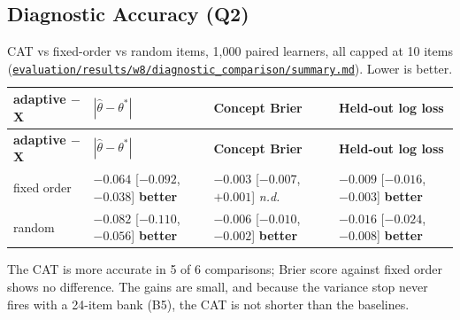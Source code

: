 \documentclass[english]{sintr}
\newcommand{\repourl}{https://github.com/Bhuvan-56/adaptive-learning-path-planner-DAT}
\newcommand{\sha}{cs5903-final-2026}
\DeclareRobustCommand{\rf}[1]{\href{\repourl/blob/\sha/#1}{\nolinkurl{#1}}}
\newcommand{\nd}{\textit{n.d.}}
\begin{document}
\subsection{Diagnostic Accuracy (Q2)}
\label{sec:diag}
{\small
\begin{longtable}{|L{2.77cm}|L{3.97cm}|L{3.88cm}|L{3.97cm}|}
\caption{CAT vs fixed-order vs random items, 1,000 paired learners, all capped at 10 items (\rf{evaluation/results/w8/diagnostic_comparison/summary.md}). Lower is better.}\\
\hline
\textbf{adaptive $-$ X} & $|\hat\theta - \theta^*|$ & \textbf{Concept Brier} & \textbf{Held-out log loss} \\ \hline
\endfirsthead
\hline \textbf{adaptive $-$ X} & $|\hat\theta - \theta^*|$ & \textbf{Concept Brier} & \textbf{Held-out log loss} \\ \hline
\endhead
fixed order & $-0.064$ [$-0.092$, $-0.038$] \textbf{better} & $-0.003$ [$-0.007$, $+0.001$] \nd & $-0.009$ [$-0.016$, $-0.003$] \textbf{better} \\ \hline
random & $-0.082$ [$-0.110$, $-0.056$] \textbf{better} & $-0.006$ [$-0.010$, $-0.002$] \textbf{better} & $-0.016$ [$-0.024$, $-0.008$] \textbf{better} \\ \hline
\end{longtable}
}
The CAT is more accurate in 5 of 6 comparisons; Brier score against fixed order shows no difference. The gains are small, and because the variance stop never fires with a 24-item bank (B5), the CAT is not shorter than the baselines.
\end{document}
